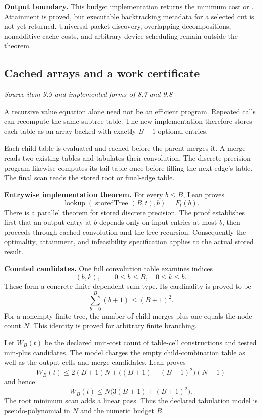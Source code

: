 \textbf{Output boundary.} This budget implementation returns the minimum cost or . Attainment is proved, but executable backtracking metadata for a selected cut is not yet returned. Universal packet discovery, overlapping decompositions, nonadditive cache costs, and arbitrary device scheduling remain outside the theorem.



\subsection{Cached arrays and a work certificate}\label{supp3:subsection:006}\textit{Source item 9.9 and implemented forms of 8.7 and 9.8}\par
A recursive value equation alone need not be an efficient program. Repeated calls can recompute the same subtree table. The new implementation therefore stores each table as an array-backed  with exactly $B+1$ optional entries.

Each child table is evaluated and cached before the parent merges it. A merge reads two existing tables and tabulates their convolution. The discrete precision program likewise computes its tail table once before filling the next edge's table. The final scan reads the stored root or final-edge table.

\textbf{Entrywise implementation theorem.} For every $b\leq B$, Lean proves
\[
\operatorname{lookup}(\operatorname{storedTree}(B,t),b)=F_t(b).
\]
There is a parallel theorem for stored discrete precision. The proof establishes first that an output entry at $b$ depends only on input entries at most $b$, then proceeds through cached convolution and the tree recursion. Consequently the optimality, attainment, and infeasibility specification applies to the actual stored result.

\textbf{Counted candidates.} One full convolution table examines indices
\[
(b,k),\qquad 0\leq b\leq B,\quad0\leq k\leq b.
\]
These form a concrete finite dependent-sum type. Its cardinality is proved to be
\[
\sum_{b=0}^B(b+1)\leq(B+1)^2.
\]
For a nonempty finite tree, the number of child merges plus one equals the node count $N$. This identity is proved for arbitrary finite branching.

Let $W_B(t)$ be the declared unit-cost count of table-cell constructions and tested min-plus candidates. The model charges the empty child-combination table as well as the output cells and merge candidates. Lean proves
\[
W_B(t)\leq2(B+1)N+\bigl((B+1)+(B+1)^2\bigr)(N-1)
\]
and hence
\[
\boxed{W_B(t)\leq N\bigl(3(B+1)+(B+1)^2\bigr).}
\]
The root minimum scan adds a linear pass. Thus the declared tabulation model is pseudo-polynomial in $N$ and the numeric budget $B$.

